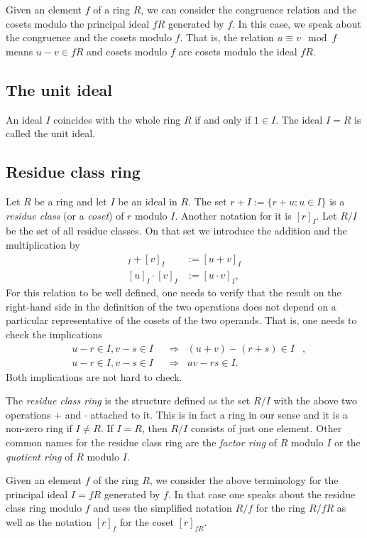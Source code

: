 \documentclass[11pt,a4paper]{amsart}
\begin{document}
Given an element  $f$ of a ring  $R$, we can consider the congruence relation and the cosets modulo the principal ideal $f R$ generated by $f$. In this case, we speak about the congruence and the cosets modulo $f$. That is, the relation $u \equiv v \mod f$ means $u - v \in f R$ and cosets modulo $f$ are cosets modulo the ideal $fR$.

\subsection{The unit ideal} An ideal $I$ coincides with the whole ring $R$ if and only if $1 \in I$. The ideal $I=R$ is called the unit ideal. 

\subsection{Residue class ring} Let $R$ be a ring and let $I$ be an ideal in $R$. The set $r + I := \{r + u \colon u \in I\}$ is a \emph{residue class} (or a \emph{coset}) of $r$ modulo $I$. Another notation for it is $[r]_I$. Let $R / I$ be the set of all residue classes. On that set we introduce the addition and the multiplication by 
\begin{align*} 
[u]_I + [v]_I & := [u+v]_I
\\
	[u]_I \cdot [v]_I & := [u \cdot v]_I, 
\end{align*} 
For this relation to be well defined, one needs to verify that the result on the right-hand side in the definition of the two operations does not depend on a particular representative of the cosets of the two operands. That is, one needs to check the implications
\begin{align*} 
		& u - r \in I, v - s \in I  & & \Longrightarrow &  (u + v ) - (r+s) \in I &, \\
		& u - r \in I, v- s \in I & & \Longrightarrow & u v - r s \in I. 
\end{align*} 
Both implications are not hard to check. 

 The \emph{residue class ring} is the structure defined as  the set $R / I$ with the above two operations $+$ and $\cdot$ attached to it. This is in fact a ring in our sense and it is a non-zero ring if $I \ne R$. If $I = R$, then $ R / I$ consists of just one element. Other common names for the residue class ring are the \emph{factor ring} of $R$ modulo $I$ or the \emph{quotient ring} of $R$ modulo $I$. 

Given an element $f$ of the ring $R$, we consider the above terminology for the principal ideal $ I = fR$ generated by $f$. In that case one speaks about the residue class ring modulo $f$ and uses the simplified notation $R / f$ for the ring $R / f R$ as well as the notation $[r]_f$ for the coset $[r]_{fR}$. 
\end{document}
